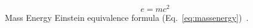 \documentclass[twoside,a4paper,10pt]{article}
\begin{document}
\begin{equation}
e = mc^2
\label{eq:massenergy}
\end{equation}
Mass Energy Einstein equivalence formula (Eq.~\ref{eq:massenergy})~\cite{calder1979einstein}.



\end{document}
